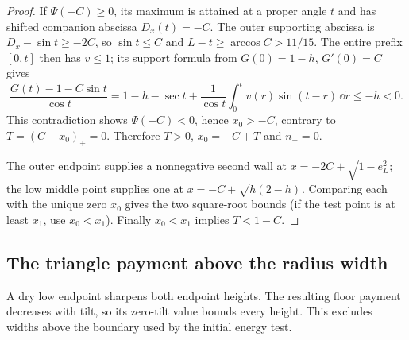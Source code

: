 \begin{proof}
If $\Psi(-C)\ge0$, its maximum is attained at a proper angle
$t$ and has shifted companion abscissa $D_x(t)=-C$.
The outer supporting abscissa is $D_x-\sin t\ge-2C$,
so $\sin t\le C$ and $L-t\ge\arccos C>11/15$.
The entire prefix $[0,t]$ then has $v\le1$; its support formula
from $G(0)=1-h$, $G'(0)=C$ gives
\[
 \frac{G(t)-1-C\sin t}{\cos t}
 =1-h-\sec t+\frac1{\cos t}\int_0^t v(r)\sin(t-r)\,\dd r
 \le-h<0.
\]
This contradiction shows $\Psi(-C)<0$, hence $x_0>-C$,
contrary to $T=(C+x_0)_+=0$.
Therefore $T>0$, $x_0=-C+T$ and $n_-=0$.

The outer endpoint supplies a nonnegative second wall at
$x=-2C+\sqrt{1-e_L^2}$; the low middle point supplies one at
$x=-C+\sqrt{h(2-h)}$.
Comparing each with the unique zero $x_0$ gives the two square-root
bounds (if the test point is at least $x_1$, use $x_0<x_1$).
Finally $x_0<x_1$ implies $T<1-C$.
\end{proof}

\subsection{The triangle payment above the radius width}

A dry low endpoint sharpens both endpoint heights. The resulting floor
payment decreases with tilt, so its zero-tilt value bounds every height.
This excludes widths above the boundary used by the initial energy test.


